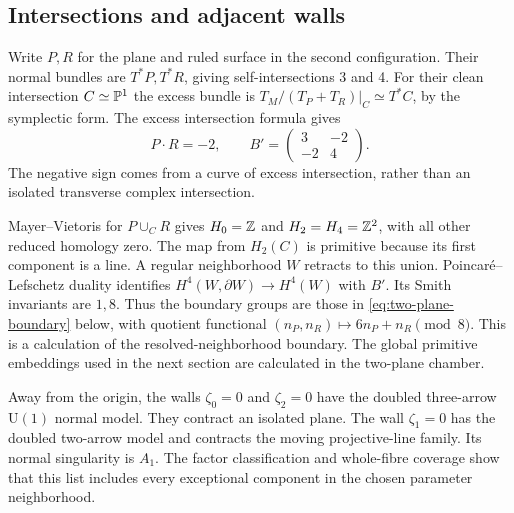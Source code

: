 \subsection{Intersections and adjacent walls}
Write $P,R$ for the plane and ruled surface in the
second configuration. Their normal bundles are
$T^*P,T^*R$, giving self-intersections 3 and 4.
For their clean intersection $C\simeq\mathbb P^1$ the
excess bundle is
$T_M/(T_P+T_R)|_C\simeq T^*C$, by the symplectic
form. The excess intersection formula gives
\begin{equation}\label{eq:ruled-intersections}
 P\cdot R=-2,\qquad
 B'=\begin{pmatrix}3&-2\\-2&4\end{pmatrix}.
\end{equation}
The negative sign comes from a curve of excess
intersection, rather than an isolated transverse
complex intersection.

Mayer--Vietoris for $P\cup_C R$ gives $H_0=\mathbb Z$
and $H_2=H_4=\mathbb Z^2$, with all other reduced homology
zero. The map from $H_2(C)$ is primitive because
its first component is a line. A regular neighborhood
$W$ retracts to this union. Poincar\'e--Lefschetz
duality identifies $H^4(W,\partial W)\to H^4(W)$
with $B'$. Its Smith invariants are $1,8$.
Thus the boundary groups are those in
\eqref{eq:two-plane-boundary} below, with quotient
functional $(n_P,n_R)\mapsto6n_P+n_R\pmod8$.
This is a calculation of the resolved-neighborhood
boundary. The global primitive embeddings used
in the next section are calculated in the two-plane
chamber.

Away from the origin, the walls $\zeta_0=0$ and
$\zeta_2=0$ have the doubled three-arrow
$\mathrm U(1)$ normal model. They contract an
isolated plane. The wall $\zeta_1=0$ has the
doubled two-arrow model and contracts the moving
projective-line family. Its normal singularity is
$A_1$. The factor classification and whole-fibre
coverage show that this list includes every
exceptional component in the chosen parameter
neighborhood.
